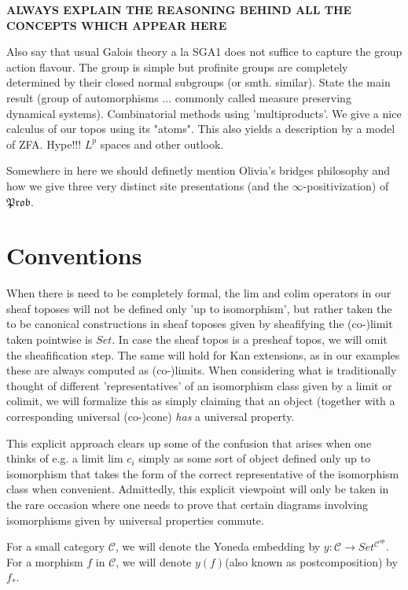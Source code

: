 \documentclass[a4paper]{amsproc}
\theoremstyle{plain}
\theoremstyle{definition}
\theoremstyle{remark}
\numberwithin{equation}{section}
\begin{document}
\begin{center}\textbf{ALWAYS EXPLAIN THE REASONING BEHIND ALL THE CONCEPTS WHICH APPEAR HERE}\end{center}
Also say that usual Galois theory a la SGA1 does not suffice to capture the group action flavour. The group is simple but profinite groups are completely determined by their closed normal subgroups (or smth. similar). State the main result (group of automorphisms ... commonly called measure preserving dynamical systems).\newline
\indent Combinatorial methods using 'multiproducts'. We give a nice calculus of our topos using its "atoms". This also yields a description by a model of ZFA. \newline
\indent Hype!!! $L^p$ spaces and other outlook. 

Somewhere in here we should definetly mention Olivia's bridges philosophy and how we give three very distinct site presentations (and the $\infty$-positivization) of $\mathfrak{Prob}$.


\section{Conventions} \label{conventions}

When there is need to be completely formal, the lim and colim operators in our sheaf toposes will not be defined only 'up to isomorphism', but rather taken the to be canonical constructions in sheaf toposes given by sheafifying the (co-)limit taken pointwise is $Set$. In case the sheaf topos is a presheaf topos, we will omit the sheafification step. The same will hold for Kan extensions, as in our examples these are always computed as (co-)limits. When considering what is traditionally thought of different 'representatives' of an isomorphism class given by a limit or colimit, we will formalize this as simply claiming that an object (together with a corresponding universal (co-)cone) \emph{has} a universal property.

This explicit approach clears up some of the confusion that arises when one thinks of e.g. a limit $\text{lim } c_i$ simply as some sort of object defined only up to isomorphism that takes the form of the correct representative of the isomorphism class when convenient. Admittedly, this explicit viewpoint will only be taken in the rare occasion where one needs to prove that certain diagrams involving isomorphisms given by universal properties commute.

For a small category $\mathcal{C}$, we will denote the Yoneda embedding by $y: \mathcal{C} \to Set^{\mathcal{C}^{op}}$. For a morphism $f$ in $\mathcal{C}$, we will denote $y(f)$(also known as postcomposition) by $f_*$.
\end{document}
